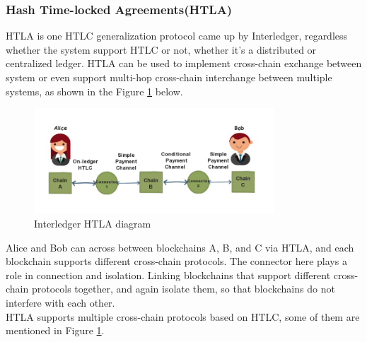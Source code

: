 \subsubsection{Hash Time-locked Agreements(HTLA)}
\noindent HTLA is one HTLC generalization protocol came up by Interledger\cite{HTLA}, regardless whether the system support HTLC or not, whether it's a distributed or centralized ledger. HTLA can be used to implement cross-chain exchange between system or even support multi-hop cross-chain interchange between multiple systems, as shown in the Figure \ref{fig:HTLA} below.
   \begin{figure}[H]
    \includegraphics[width=0.8\textwidth]{./figures/HTLA.png}
    \centering
    \caption{Interledger HTLA diagram}%
    \centering
    \label{fig:HTLA}
    \end{figure}
    
\noindent Alice and Bob can across between blockchains A, B, and C via HTLA, and each blockchain supports different cross-chain protocols. The connector here plays a role in connection and isolation. Linking blockchains that support different cross-chain protocols together, and again isolate them, so that blockchains do not interfere with each other.\\
\noindent HTLA supports multiple cross-chain protocols based on HTLC, some of them are mentioned in Figure \ref{fig:HTLA}.


